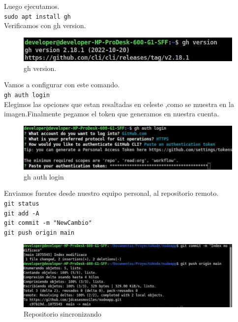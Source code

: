 Luego ejecutamos.\\
\texttt{sudo apt install gh}\\
Verificamos con gh version.\\
\begin{figure}[H] %
	\centering %
	\includegraphics[scale=0.7]{images/c4_4.jpg}
	\caption{gh version.}
\end{figure}
Vamos a configurar con este comando.\\
\texttt{gh auth login}\\

Elegimos las opciones que estan resaltadas en celeste ,como se muestra en la imagen.Finalmente pegamos el token que generamos en nuestra cuenta.\\
\begin{figure}[H] %
	\centering %
	\includegraphics[scale=0.7]{images/c4_5.jpg}
	\caption{gh auth login}
\end{figure}

Enviamos fuentes desde nuestro equipo personal, al repositorio remoto.\\
\texttt{git status}\\
\texttt{git add -A}\\
\texttt{git commit -m "NewCambio"}\\
\texttt{git push origin main}\\
\begin{figure}[H] %
	\centering %
	\includegraphics[scale=0.7]{images/c4_6.jpg}
	\caption{Repositorio sincronizando}
\end{figure}

